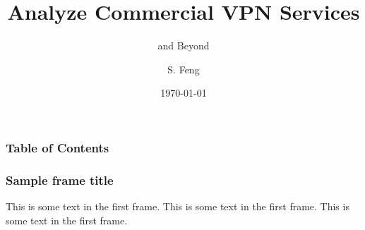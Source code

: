 \documentclass{beamer}
\title{Analyze Commercial VPN Services}
\subtitle[short subtitle]{and Beyond}
\author[Feng, Shuo]{S. Feng}
\institute{NIMS Lab}
\date{\today}
\begin{document}
\frame{\titlepage}

\begin{frame}
  \frametitle{Table of Contents}
  \tableofcontents
\end{frame}

\begin{frame}
  \frametitle{Sample frame title}
  This is some text in the first frame. This is some text in the first frame. This is some text in the first frame.
\end{frame}
\end{document}
